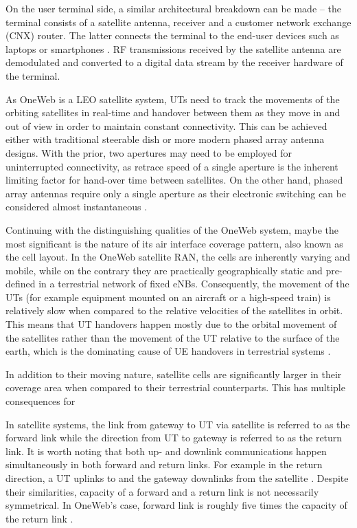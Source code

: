 \documentclass[english, 12pt, a4paper, elec, utf8, a-1b, online]{aaltothesis}
\begin{document}
On the user terminal side, a similar architectural breakdown can be made – the terminal consists of a satellite antenna, receiver and a customer network exchange (CNX) router.
The latter connects the terminal to the end-user devices such as laptops or smartphones \cite{henri2020oneweb}. RF transmissions received by the satellite antenna are demodulated and converted to a digital data stream by the receiver hardware of the terminal.

As OneWeb is a LEO satellite system, UTs need to track the movements of the orbiting satellites in real-time and handover between them as they move in and out of view in order to maintain constant connectivity.
This can be achieved either with traditional steerable dish or more modern phased array antenna designs.
With the prior, two apertures may need to be employed for uninterrupted connectivity, as retrace speed of a single aperture is the inherent limiting factor for hand-over time between satellites.
On the other hand, phased array antennas require only a single aperture as their electronic switching can be considered almost instantaneous \cite{worldvu2016loi}.

Continuing with the distinguishing qualities of the OneWeb system, maybe the most significant is the nature of its air interface coverage pattern, also known as the cell layout.
In the OneWeb satellite RAN, the cells are inherently varying and mobile, while on the contrary they are practically geographically static and pre-defined in a terrestrial network of fixed eNBs.
Consequently, the movement of the UTs (for example equipment mounted on an aircraft or a high-speed train) is relatively slow when compared to the relative velocities of the satellites in orbit.
This means that UT handovers happen mostly due to the orbital movement of the satellites rather than the movement of the UT relative to the surface of the earth, which is the dominating cause of UE handovers in terrestrial systems \cite{corson2019admission}.

In addition to their moving nature, satellite cells are significantly larger in their coverage area when compared to their terrestrial counterparts.
This has multiple consequences for \cite{corson2019admission}

In satellite systems, the link from gateway to UT via satellite is referred to as the forward link while the direction from UT to gateway is referred to as the return link.
It is worth noting that both up- and downlink communications happen simultaneously in both forward and return links.
For example in the return direction, a UT uplinks to and the gateway downlinks from the satellite \cite{kymeta2019link}.
Despite their similarities, capacity of a forward and a return link is not necessarily symmetrical.
In OneWeb's case, forward link is roughly five times the capacity of the return link \cite{worldvu2016loi, portillo2019technical}.
\end{document}
